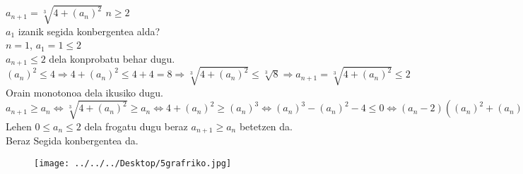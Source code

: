 \begin{adibide}
\item
$a_{n+1}= \sqrt[3]{4+(a_{n})^{2}}$   $n \geqslant 2$\\
$a_{1}$ izanik segida konbergentea alda?\\

$n=1$, $a_{1}=1\leqslant 2$\\
$a_{n+1}\leqslant 2$ dela konprobatu behar dugu.\\

$(a_{n})^{2} \leqslant 4\Rightarrow 4+(a_{n})^{2}\leqslant 4+4= 8\Rightarrow \sqrt[3]{4+(a_{n})^{2}} \leqslant \sqrt[3]{8} \Rightarrow a_{n+1}= \sqrt[3]{4+(a_{n})^{2}}\leqslant 2$\\

Orain monotonoa dela ikusiko dugu.\\

$a_{n+1}\geqslant a_{n}\Leftrightarrow \sqrt[3]{4+(a_{n})^{2}}\geqslant a_{n} \Leftrightarrow 4+ (a_{n})^{2}\geqslant (a_{n})^{3}\Leftrightarrow (a_{n})^{3}- (a_{n})^{2}-4\leqslant 0\Leftrightarrow (a_{n}-2)((a_{n})^{2}+(a_{n})+2)\leqslant 0$\\

Lehen $0\leqslant a_{n}\leqslant 2$ dela frogatu dugu beraz $a_{n+1}\geqslant a_{n}$ betetzen da.\\

Beraz Segida konbergentea da.\\

\begin{figure}[hbtp]
\caption{}
\centering
\texttt{[image: ../../../Desktop/5grafriko.jpg]}
\end{figure}

\end{adibide}

